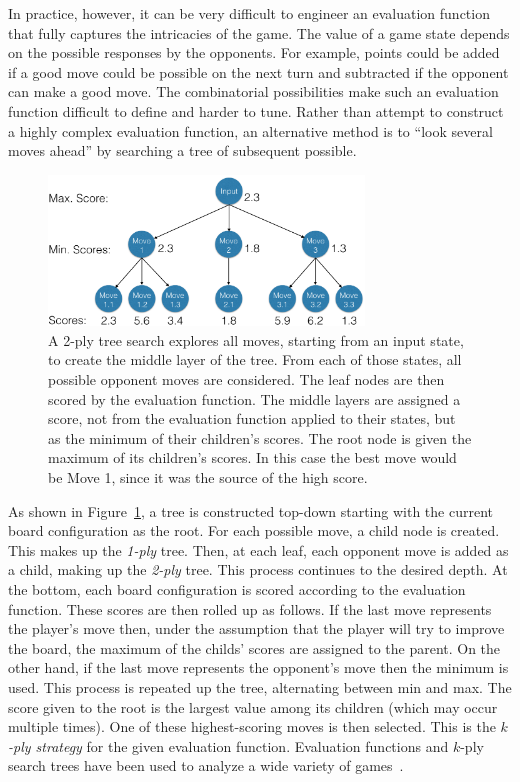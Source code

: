 In practice, however, it can be very difficult to engineer an evaluation function that fully captures the intricacies of the game. The value of a game state depends on the possible responses by the opponents. 
For example, points could be added if a good move could be possible on the next turn and subtracted if the opponent can make a good move. 
The combinatorial possibilities make such an evaluation function difficult to define and harder to tune.
Rather than attempt to construct a highly complex evaluation function, an alternative method is to ``look several moves ahead'' by searching a tree of subsequent possible.

\begin{figure}[h!tbp]
\includegraphics[width=3.3in]{tree-pic2.png}
\caption{A 2-ply tree search explores all moves, starting from an input state, to create the middle layer of the tree. From each of those states, all possible opponent moves are considered. The leaf nodes are then scored by the evaluation function. The middle layers are assigned a score, not from the evaluation function applied to their states, but as the minimum of their children's scores. The root node is given the maximum of its children's scores. In this case the best move would be Move 1, since it was the source of the high score.\label{fig:minmaxtree}}
\end{figure}

As shown in Figure~\ref{fig:minmaxtree}, a tree is constructed top-down starting with the current board configuration as the root. For each possible move, a child node is created. This makes up the {\em 1-ply} tree. Then, at each leaf, each opponent move is added as a child, making up the {\em 2-ply} tree. This process continues to the desired depth. At the bottom, each board configuration is scored according to the evaluation function. These scores are then rolled up as follows. If the last move represents the player's move then, under the assumption that the player will try to improve the board, the maximum of the childs' scores are assigned to the parent. On the other hand, if the last move represents the opponent's move then the minimum is used. This process is repeated up the tree, alternating between min and max. The score given to the root is the largest value among its children (which may occur multiple times). One of these highest-scoring moves is then selected. This is the {\em $k$-ply strategy} for the given evaluation function. Evaluation functions and $k$-ply search trees have been used to analyze a wide variety of games~\cite{levy2009computer}. 

